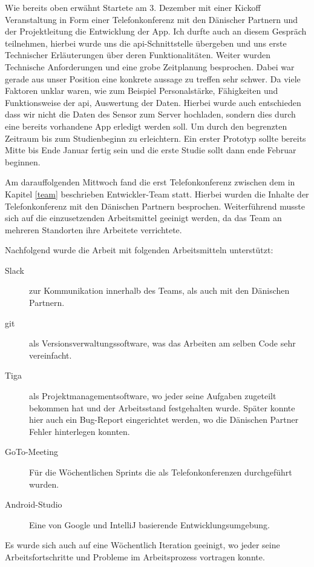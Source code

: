 Wie bereits oben erwähnt Startete am 3. Dezember mit einer Kickoff Veranstaltung in Form einer Telefonkonferenz mit den Dänischer Partnern und der Projektleitung die Entwicklung der App. Ich durfte auch an diesem Gespräch teilnehmen, hierbei wurde uns die \ac{api}-Schnittstelle übergeben und uns erste Technischer Erläuterungen über deren Funktionalitäten. Weiter wurden Technische Anforderungen  und eine grobe Zeitplanung besprochen. Dabei war gerade aus unser Position eine konkrete aussage zu treffen sehr schwer. Da viele Faktoren unklar waren, wie zum Beispiel Personalstärke, Fähigkeiten und Funktionsweise der \ac{api}, Auswertung der Daten. %
Hierbei wurde auch entschieden dass wir nicht die Daten des Sensor zum Server hochladen, sondern dies durch eine bereits vorhandene App erledigt werden soll. Um durch den begrenzten Zeitraum bis zum Studienbeginn zu erleichtern. Ein erster Prototyp sollte bereits Mitte bis Ende Januar fertig sein und die erste Studie sollt dann ende Februar beginnen.

Am darauffolgenden Mittwoch fand die erst Telefonkonferenz zwischen dem in Kapitel \ref{team} beschrieben Entwickler-Team statt. Hierbei wurden die Inhalte der Telefonkonferenz mit den Dänischen Partnern besprochen.%
Weiterführend musste sich auf die einzusetzenden Arbeitsmittel geeinigt werden, da das Team an mehreren Standorten ihre Arbeitete verrichtete.

Nachfolgend wurde die Arbeit mit folgenden Arbeitsmitteln unterstützt:
\begin{description}
	\item[Slack] zur Kommunikation innerhalb des Teams, als auch mit den Dänischen Partnern.
	\item[\gls{git}] als Versionsverwaltungssoftware, was das Arbeiten am selben Code sehr vereinfacht.
	\item[Tiga] als Projektmanagementsoftware, wo jeder seine Aufgaben zugeteilt bekommen hat und der Arbeitsstand festgehalten wurde. Später konnte hier auch ein Bug-Report eingerichtet werden, wo die Dänischen Partner Fehler hinterlegen konnten.
	\item[GoTo-Meeting] Für die Wöchentlichen Sprints die als  Telefonkonferenzen durchgeführt wurden.
	\item[Android-Studio] Eine von Google und IntelliJ  basierende Entwicklungsumgebung.
\end{description}
 Es wurde sich auch auf eine Wöchentlich Iteration geeinigt, wo jeder seine Arbeitsfortschritte und  Probleme im Arbeitsprozess vortragen  konnte.
 
